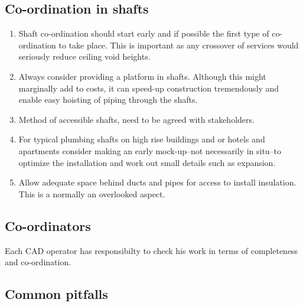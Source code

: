 \subsection*{Co-ordination in shafts}

\begin{enumerate}
\item Shaft co-ordination should start early and if possible the first type of co-ordination to take place. This is important as any crossover of services
would seriously reduce ceiling void heights.
\item Always consider providing a platform in shafts. Although this might marginally add to costs, it can speed-up construction tremendously and enable easy hoisting of piping through the shafts.
\item Method of accessible shafts, need to be agreed with stakeholders.
\item For typical plumbing shafts on high rise buildings and or hotels and
apartments consider making an early mock-up--not necessarily in situ--to 
optimize the installation and work out small details such as expansion.
\item Allow adequate space behind ducts and pipes for access to install insulation. This is a normally an overlooked aspect.
\end{enumerate}


\subsection*{Co-ordinators}

Each CAD operator has responsibilty to check his work in terms of
completeness and co-ordination.

\subsection*{Common pitfalls}

